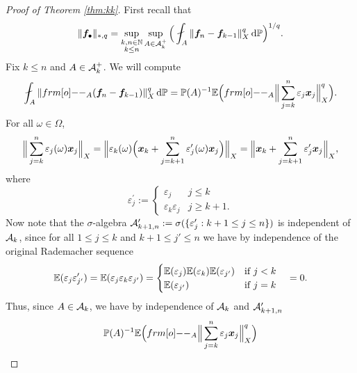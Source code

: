 \begin{proof}[Proof of Theorem \ref{thm:kk}]
  First recall that
  \begin{equation*}
    \|\mb{f}_{\bullet}\|_{*,q} =  \sup_{\substack{k,n \in \N \\ k \leq n}} \sup_{A \in \mc{A}_k^{+}} \Big( \fint_{A} \|\mb{f}_n - \mb{f}_{k-1}\|_{X}^{q} \, \dd\P\Big)^{1/q}.
  \end{equation*}
  Fix $k \leq n$ and $A \in \mathcal{A}_k^{+}$.
  We will compute
  \begin{equation*}
    \fint_{A} \|\1_{A} (\mb{f}_n - \mb{f}_{k-1})\|_{X}^q \, \dd\P = \P(A)^{-1} \E \Big( \1_{A} \Big\| \sum_{j=k}^{n} \varepsilon_j \mb{x}_j\Big\|_{X}^q \Big).
  \end{equation*}
  For all $\omega \in \Omega$,
  \begin{equation*}
    \Big\| \sum_{j=k}^{n} \varepsilon_j(\omega) \bm{x}_j\Big\|_{X} = \Big\| \varepsilon_k(\omega) \Big( \bm{x}_k + \sum_{j=k+1}^{n} \varepsilon_{j}^{\prime}(\omega) \bm{x}_j \Big) \Big\|_{X} = \Big\|\bm{x}_k + \sum_{j=k+1}^{n} \varepsilon_{j}^{\prime} \bm{x}_j \Big\|_{X},
  \end{equation*}
  where
  \begin{equation*}
    \varepsilon_{j}^{\prime} :=
    \begin{cases}
      \varepsilon_{j} & j \leq k \\
      \varepsilon_{k} \varepsilon_{j} & j \geq k+1.
    \end{cases}
  \end{equation*}
  Now note that the $\sigma$-algebra $\mathcal{A}^\prime_{k+1,n} := \sigma(\{\varepsilon_j^\prime : k+1 \leq j \leq n\})$ is independent of $\mathcal{A}_k$, since for all $1 \leq j \leq k$ and $k+1 \leq j' \leq n$ we have by independence of the original Rademacher sequence
  \begin{equation*}
    \mathbb{E}(\varepsilon_j \varepsilon_{j'}^\prime) = \mathbb{E}(\varepsilon_j \varepsilon_k \varepsilon_{j'})
    =
    \begin{cases}
      \mathbb{E}(\varepsilon_j) \mathbb{E}(\varepsilon_k) \mathbb{E}(\varepsilon_{j'}) & \text{if $j < k$} \\
       \mathbb{E}(\varepsilon_{j'}) & \text{if $j = k$}
    \end{cases}
    \quad = 0.
  \end{equation*}
  Thus, since $A \in \mathcal{A}_k$, we have by independence of $\mathcal{A}_k$ and $\mathcal{A}^{\prime}_{k+1, n}$
  \begin{equation*}
    \begin{aligned}
      \P(A)^{-1} \E \Big( \1_{A} \Big\| \sum_{j=k}^{n} \varepsilon_j \mb{x}_j\Big\|_{X}^q \Big)

\end{aligned}
\end{equation*}
\end{proof}
